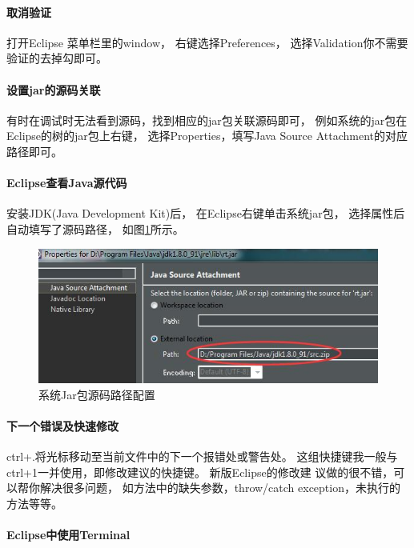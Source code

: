 \documentclass{book}
\begin{document}
\paragraph{取消验证}

打开Eclipse 菜单栏里的window，
右键选择Preferences，
选择Validation你不需要验证的去掉勾即可。

\paragraph{设置jar的源码关联}

有时在调试时无法看到源码，找到相应的jar包关联源码即可，
例如系统的jar包在Eclipse的树的jar包上右键，
选择Properties，填写Java Source Attachment的对应路径即可。

\paragraph{Eclipse查看Java源代码}

安装JDK(Java Development Kit)后，
在Eclipse右键单击系统jar包，
选择属性后自动填写了源码路径，
如图\ref{code:JavaJarSourceCodeConfiguration}所示。

\begin{figure}[htbp]
	\centering
	\includegraphics[scale=0.5]{JavaJarSourceCodeConfiguration.jpg}
	\caption{系统Jar包源码路径配置}
	\label{code:JavaJarSourceCodeConfiguration}
\end{figure}

\paragraph{下一个错误及快速修改}

ctrl+.将光标移动至当前文件中的下一个报错处或警告处。
这组快捷键我一般与ctrl+1一并使用，即修改建议的快捷键。
新版Eclipse的修改建 议做的很不错，可以帮你解决很多问题，
如方法中的缺失参数，throw/catch exception，未执行的方法等等。

\paragraph{Eclipse中使用Terminal}
\end{document}

